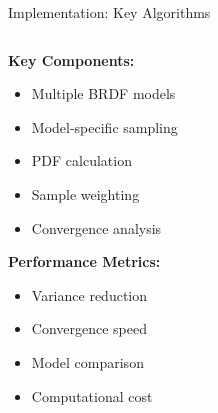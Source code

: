\documentclass[aspectratio=169]{beamer}
\begin{document}
\begin{frame}{Implementation: Key Algorithms}
\begin{columns}
\begin{column}{0.5\textwidth}
            \textbf{Key Components:}
            \begin{itemize}
                \item Multiple BRDF models
                \item Model-specific sampling
                \item PDF calculation
                \item Sample weighting
                \item Convergence analysis
            \end{itemize}
            
            \vspace{0.5cm}
            \textbf{Performance Metrics:}
            \begin{itemize}
                \item Variance reduction
                \item Convergence speed
                \item Model comparison
                \item Computational cost
            \end{itemize}
        \end{column}
    \end{columns}
\end{frame}
\end{document}
